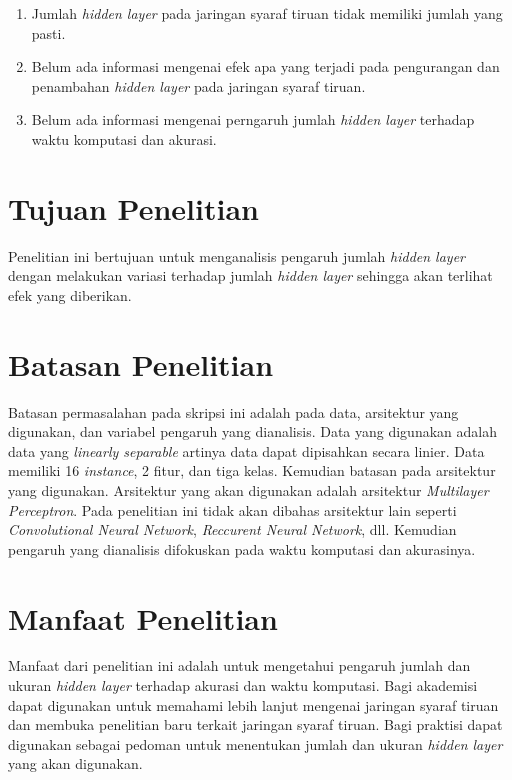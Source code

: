 \begin{enumerate}
    \item Jumlah \textit{hidden layer} pada jaringan syaraf tiruan tidak memiliki jumlah yang pasti.
    \item Belum ada informasi mengenai efek apa yang terjadi pada pengurangan dan penambahan \textit{hidden layer} pada jaringan syaraf tiruan.
    \item Belum ada informasi mengenai perngaruh jumlah \textit{hidden layer} terhadap waktu komputasi dan akurasi.
\end{enumerate}

\section{Tujuan Penelitian}

Penelitian ini bertujuan untuk menganalisis pengaruh jumlah \textit{hidden layer} dengan melakukan variasi terhadap jumlah \textit{hidden layer} sehingga akan terlihat efek yang diberikan.

\section{Batasan Penelitian}

Batasan permasalahan pada skripsi ini adalah pada data, arsitektur yang digunakan, dan variabel pengaruh yang dianalisis. Data yang digunakan adalah data yang \textit{linearly separable} artinya data dapat dipisahkan secara linier. Data memiliki 16 \textit{instance}, 2 fitur, dan tiga kelas. Kemudian batasan pada arsitektur yang digunakan. Arsitektur yang akan digunakan adalah arsitektur \textit{Multilayer Perceptron}. Pada penelitian ini tidak akan dibahas arsitektur lain seperti \textit{Convolutional Neural Network}, \textit{Reccurent Neural Network}, dll. Kemudian pengaruh yang dianalisis difokuskan pada waktu komputasi dan akurasinya.


\section{Manfaat Penelitian}

Manfaat dari penelitian ini adalah untuk mengetahui pengaruh jumlah dan ukuran \textit{hidden layer} terhadap akurasi dan waktu komputasi. Bagi akademisi dapat digunakan untuk memahami lebih lanjut mengenai jaringan syaraf tiruan dan membuka penelitian baru terkait jaringan syaraf tiruan. Bagi praktisi dapat digunakan sebagai pedoman untuk menentukan jumlah dan ukuran \textit{hidden layer} yang akan digunakan.


